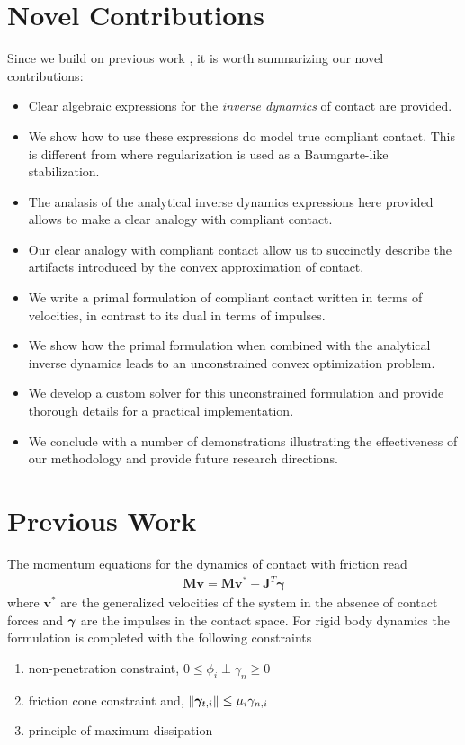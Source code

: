 \section{Novel Contributions}

Since we build on previous work \cite{bib:anitescu2006,
bib:anitescu2010,bib:todorov2014}, it is worth summarizing our novel
contributions:
\begin{itemize}
	\item Clear algebraic expressions for the \textit{inverse dynamics} of
	contact are provided.
	\item We show how to use these expressions do model true compliant contact.
	This is different from \cite{bib:todorov2014} where regularization is used
	as a Baumgarte-like stabilization.
	\item The analasis of the analytical inverse dynamics expressions here
	provided allows to make a clear analogy with compliant contact.
	\item Our clear analogy with compliant contact allow us to succinctly
	describe the artifacts introduced by the convex approximation of contact.
	\item We write a primal formulation of compliant contact written in terms of
	velocities, in contrast to its dual in terms of impulses.
	\item We show how the primal formulation when combined with the analytical
	 inverse dynamics leads to an unconstrained convex optimization problem.
	\item We develop a custom solver for this unconstrained formulation and
	provide thorough details for a practical implementation.
	\item We conclude with a number of demonstrations illustrating the
	effectiveness of our methodology and provide future research directions.
\end{itemize}

\section{Previous Work}
\label{sec:previous_work}

The momentum equations for the dynamics of contact with friction read
\begin{eqnarray}
	\mathbf{M}\mathbf{v} = \mathbf{M}\mathbf{v}^* + \mathbf{J}^T\mathbf{\gamma}
	\label{eq:momentum_balance}
\end{eqnarray}
where $\mathbf{v}^*$ are the generalized velocities of the system in the absence
of contact forces and ${\bm\gamma}$ are the impulses in the contact space. For rigid
body dynamics the formulation is completed with the following constraints
\begin{enumerate}
	\item non-penetration constraint, $0\le\phi_i\perp\gamma_n\ge0$
	\item friction cone constraint and, $\Vert{\bm\gamma}_{t,i}\Vert\le
	\mu_i\gamma_{n,i}$
	\item principle of maximum dissipation
\end{enumerate}

